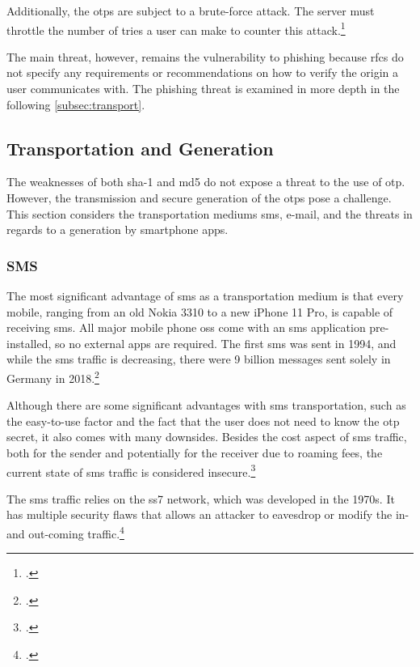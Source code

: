 Additionally, the \glspl{otp} are subject to a brute-force attack. The server must throttle the number of tries a user can make to counter this attack.\footcites[See][6]{m2011rfc}[See][21-22]{m2005rfc}[See][240]{Schwartz2018}

The main threat, however, remains the vulnerability to phishing because \glspl{rfc} do not specify any requirements or recommendations on how to verify the origin a user communicates with. The phishing threat is examined in more depth in the following \autoref{subsec:transport}.

\subsection{Transportation and Generation}
\label{subsec:transport}

The weaknesses of both \gls{sha}-1 and \gls{md}5 do not expose a threat to the use of \gls{otp}. However, the transmission and secure generation of the \glspl{otp} pose a challenge. This section considers the transportation mediums \gls{sms}, e-mail, and the threats in regards to a generation by smartphone apps.

\subsubsection{SMS}

The most significant advantage of \gls{sms} as a transportation medium is that every mobile, ranging from an old Nokia 3310 to a new iPhone 11 Pro, is capable of receiving \gls{sms}. All major mobile phone \glspl{os} come with an \gls{sms} application pre-installed, so no external apps are required. The first \gls{sms} was sent in 1994, and while the \gls{sms} traffic is decreasing, there were 9 billion messages sent solely in Germany in 2018.\footcites[See][2--3]{alpert2012mobile}[See][57]{bundesnetzagentur}

Although there are some significant advantages with \gls{sms} transportation, such as the \frqq easy-to-use\flqq{} factor and the fact that the user does not need to know the \gls{otp} secret, it also comes with many downsides. Besides the cost aspect of \gls{sms} traffic, both for the sender and potentially for the receiver due to roaming fees, the current state of \gls{sms} traffic is considered insecure.\footcites[See][167]{8632643}

The \gls{sms} traffic relies on the \gls{ss7} network, which was developed in the 1970s. It has multiple security flaws that allows an attacker to eavesdrop or modify the in- and out-coming traffic.\footcites[See][17--18]{WELCH201717}[See][3--4]{7997246}[See][40, 46]{puzankov2017stealthy}

